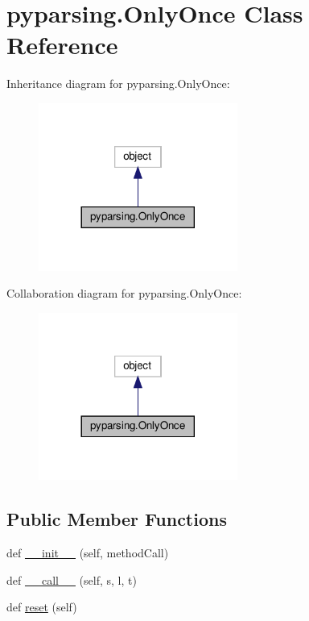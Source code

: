 \hypertarget{classpyparsing_1_1OnlyOnce}{}\section{pyparsing.\+Only\+Once Class Reference}
\label{classpyparsing_1_1OnlyOnce}


Inheritance diagram for pyparsing.\+Only\+Once\+:
\nopagebreak
\begin{figure}[H]
\begin{center}
\leavevmode
\includegraphics[width=185pt]{classpyparsing_1_1OnlyOnce__inherit__graph}
\end{center}
\end{figure}


Collaboration diagram for pyparsing.\+Only\+Once\+:
\nopagebreak
\begin{figure}[H]
\begin{center}
\leavevmode
\includegraphics[width=185pt]{classpyparsing_1_1OnlyOnce__coll__graph}
\end{center}
\end{figure}
\subsection*{Public Member Functions}
\begin{DoxyCompactItemize}
\item 
def \hyperlink{classpyparsing_1_1OnlyOnce_a0e7e377312c13d91e629b6b12ca73e82}{\+\_\+\+\_\+init\+\_\+\+\_\+} (self, method\+Call)
\item 
def \hyperlink{classpyparsing_1_1OnlyOnce_a0f5dbfa79e8403af478b0d835e09f5b5}{\+\_\+\+\_\+call\+\_\+\+\_\+} (self, s, l, t)
\item 
def \hyperlink{classpyparsing_1_1OnlyOnce_a4861aa49333b67d8db067f23c1f0acb9}{reset} (self)
\end{DoxyCompactItemize}
